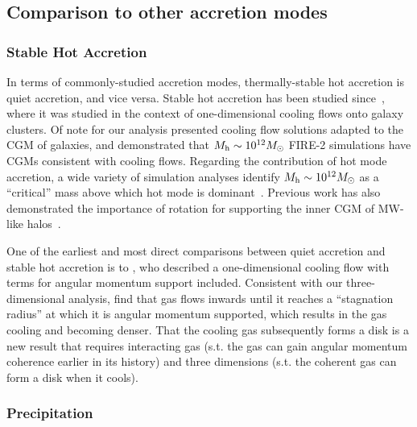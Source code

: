\documentclass[fleqn,usenatbib]{mnras}
\begin{document}
\subsection{Comparison to other accretion modes}
\label{s: modes}

\subsubsection{Stable Hot Accretion}
\label{s: modes -- hot}

In terms of commonly-studied accretion modes, thermally-stable hot accretion is quiet accretion, and vice versa.
Stable hot accretion has been studied since~\cite{Cowie1977a}, where it was studied in the context of one-dimensional cooling flows onto galaxy clusters.
Of note for our analysis \cite{Stern2019} presented cooling flow solutions adapted to the CGM of galaxies, and \cite{Stern2020} demonstrated that $M_{\rm h} \sim 10^{12} M_\odot$ FIRE-2 simulations have CGMs consistent with cooling flows.
Regarding the contribution of hot mode accretion, a wide variety of simulation analyses identify $M_{\rm h} \sim 10^{12} M_\odot$ as a ``critical'' mass above which hot mode is dominant~\citep[e.g.][, and many others]{Correa2017, Stern2020}.
Previous work has also demonstrated the importance of rotation for supporting the inner CGM of MW-like halos~\citep{Oppenheimer2018}.

One of the earliest and most direct comparisons between quiet accretion and stable hot accretion is to \cite{Cowie1980}, who described a one-dimensional cooling flow with terms for angular momentum support included.
Consistent with our three-dimensional analysis, \citeauthor{Cowie1980} find that gas flows inwards until it reaches a ``stagnation radius'' at which it is angular momentum supported, which results in the gas cooling and becoming denser.
That the cooling gas subsequently forms a disk is a new result that requires interacting gas (s.t. the gas can gain angular momentum coherence earlier in its history) and three dimensions (s.t. the coherent gas can form a disk when it cools).

\subsubsection{Precipitation}
\label{s: modes -- precipitation}
\end{document}
